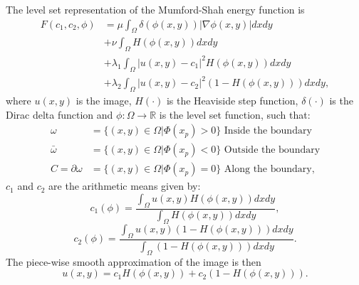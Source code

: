 The level set representation of the Mumford-Shah energy function is 
\begin{equation}
	\begin{split}
		F(c_1, c_2, \phi) & = \mu \int_\Omega \delta(\phi(x,y))|\nabla\phi(x,y)|dxdy \\
		& + \nu \int_\Omega H(\phi(x,y))dxdy \\
		& + \lambda_1 \int_\Omega |u(x,y)-c_1|^2H(\phi(x,y))dxdy \\
		& + \lambda_2 \int_\Omega |u(x,y)-c_2|^2(1-H(\phi(x,y)))dxdy,
	\end{split}
	\label{eq:mumfordshahfunction}
\end{equation}
where $u(x,y)$ is the image, $H(\cdot)$ is the Heaviside step function, $\delta(\cdot)$ is the Dirac delta function and $\phi:\Omega \rightarrow \mathbb{R}$ is the level set function, such that:
\begin{equation}
	\begin{split}
		\omega & = \{(x,y) \in \Omega|\Phi(x_p)>0\} \text{ Inside the boundary} \\
		\bar{\omega} & = \{(x,y) \in \Omega|\Phi(x_p)<0\} \text{ Outside the boundary} \\
		C = \partial\omega & = \{(x,y) \in \Omega|\Phi(x_p)=0\} \text{ Along the boundary},
	\end{split}
	\label{eq:levelsetrepresentation}
\end{equation}
$c_1$ and $c_2$ are the arithmetic means given by:
\begin{equation}
	c_1(\phi) = \frac{\int_\Omega u(x,y)H(\phi(x,y))dxdy}{\int_\Omega H(\phi(x,y))dxdy},
	\label{eq:c1}
\end{equation}
\begin{equation}
c_2(\phi) = \frac{\int_\Omega u(x,y)(1-H(\phi(x,y)))dxdy}{\int_\Omega (1-H(\phi(x,y)))dxdy}.
\label{eq:c2}
\end{equation}
The piece-wise smooth approximation of the image is then 
\begin{equation}
	u(x,y) = c_1 H(\phi(x,y)) + c_2(1-H(\phi(x,y))).
	\label{eq:piecewiseapproximation}
\end{equation}

